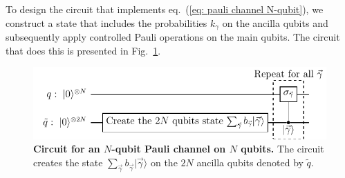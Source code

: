 \documentclass[10pt,letterpaper]{article} %
\newcommand{\fref}[1]{Fig.~\ref{#1}}
\newcommand{\eref}[1]{eq.~(\ref{#1})}
\begin{document}

To design the circuit that implements \eref{eq: pauli channel N-qubit}, we construct a state that 
includes the probabilities $k_{\gamma}$ on the ancilla qubits and subsequently
apply controlled Pauli operations on the main qubits.  The circuit that does
this is presented in \fref{fig: circuit-pauli}. 


\begin{figure} %
\centering
\includegraphics{images/circuito_general.pdf}
\caption{{\bf Circuit for an $N$-qubit
Pauli channel on $N$ qubits.}
The circuit creates the state $\sum_{\vec{\gamma}} b_{\vec{\gamma}}|\vec{\gamma}\rangle$ 
on the $2N$ ancilla qubits denoted by $\tilde{q}$. }
\label{fig: circuit-pauli}
\end{figure} %
\end{document}
